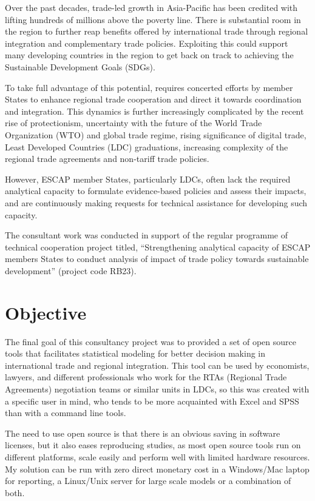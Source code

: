 \documentclass[12pt,reqno,oneside,pdftex]{formato-puc/puctesis} %
\begin{document}
Over the past decades, trade-led growth in Asia-Pacific has been
credited with lifting hundreds of millions above the poverty line. There
is substantial room in the region to further reap benefits offered by
international trade through regional integration and complementary trade
policies. Exploiting this could support many developing countries in the
region to get back on track to achieving the Sustainable Development
Goals (SDGs).

To take full advantage of this potential, requires concerted efforts by
member States to enhance regional trade cooperation and direct it
towards coordination and integration. This dynamics is further
increasingly complicated by the recent rise of protectionism,
uncertainty with the future of the World Trade Organization (WTO) and
global trade regime, rising significance of digital trade, Least
Developed Countries (LDC) graduations, increasing complexity of the
regional trade agreements and non-tariff trade policies.

However, ESCAP member States, particularly LDCs, often lack the required
analytical capacity to formulate evidence-based policies and assess
their impacts, and are continuously making requests for technical
assistance for developing such capacity.

The consultant work was conducted in support of the regular programme of
technical cooperation project titled, ``Strengthening analytical
capacity of ESCAP members States to conduct analysis of impact of trade
policy towards sustainable development'' (project code RB23).

\hypertarget{objective}{%
\section{Objective}\label{objective}}

The final goal of this consultancy project was to provided a set of open
source tools that facilitates statistical modeling for better decision
making in international trade and regional integration. This tool can be
used by economists, lawyers, and different professionals who work for
the RTAs (Regional Trade Agreements) negotiation teams or similar units
in LDCs, so this was created with a specific user in mind, who tends to
be more acquainted with Excel and SPSS than with a command line tools.

The need to use open source is that there is an obvious saving in
software licenses, but it also eases reproducing studies, as most open
source tools run on different platforms, scale easily and perform well
with limited hardware resources. My solution can be run with zero direct
monetary cost in a Windows/Mac laptop for reporting, a Linux/Unix server
for large scale models or a combination of both.
\end{document}

